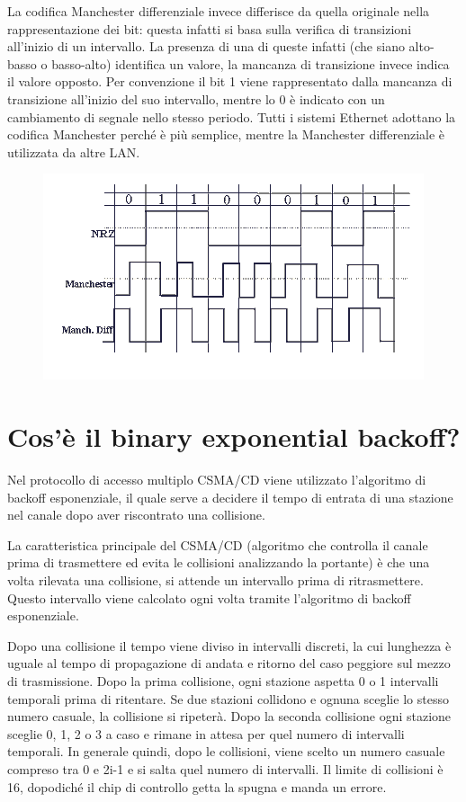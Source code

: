La codifica Manchester differenziale invece differisce da quella originale nella rappresentazione dei bit: questa infatti si basa sulla verifica di transizioni all’inizio di un intervallo. La presenza di una di queste infatti (che siano alto-basso o basso-alto) identifica un valore, la mancanza di transizione invece indica il valore opposto. Per convenzione il bit 1 viene rappresentato dalla mancanza di transizione all’inizio del suo intervallo, mentre lo 0 è indicato con un cambiamento di segnale nello stesso periodo.
Tutti i sistemi Ethernet adottano la codifica Manchester perché è più semplice, mentre la Manchester differenziale è utilizzata da altre LAN.

\begin{figure}[H]
\centering
\includegraphics[scale=0.8]{res/img/28_CodificaManchester.png}
\end{figure}
 
\section{Cos’è il binary exponential backoff?}

Nel protocollo di accesso multiplo CSMA/CD viene utilizzato l’algoritmo di backoff esponenziale, il quale serve a decidere il tempo di entrata di una stazione nel canale dopo aver riscontrato una collisione.

La caratteristica principale del CSMA/CD (algoritmo che controlla il canale prima di trasmettere ed evita le collisioni analizzando la portante) è che una volta rilevata una collisione, si attende un intervallo prima di ritrasmettere. Questo intervallo viene calcolato ogni volta tramite l’algoritmo di backoff esponenziale.

Dopo una collisione il tempo viene diviso in intervalli discreti, la cui lunghezza è uguale al tempo di propagazione di andata e ritorno del caso peggiore sul mezzo di trasmissione.
Dopo la prima collisione, ogni stazione aspetta 0 o 1 intervalli temporali prima di ritentare. Se due stazioni collidono e ognuna sceglie lo stesso numero casuale, la collisione si ripeterà. Dopo la seconda collisione ogni stazione sceglie 0, 1, 2 o 3 a caso e rimane in attesa per quel numero di intervalli temporali. In generale quindi, dopo le collisioni, viene scelto un numero casuale compreso tra 0 e 2i-1 e si salta quel numero di intervalli. Il limite di collisioni è 16, dopodiché il chip di controllo getta la spugna e manda un errore.

